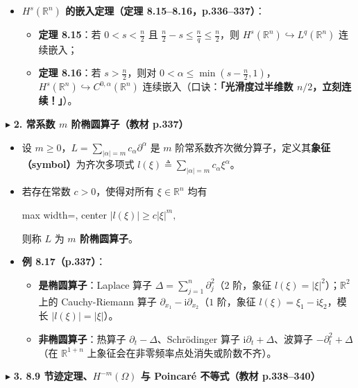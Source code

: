 \documentclass[11pt,a4paper]{article}
\providecommand{\tightlist}{\setlength{\itemsep}{2pt}\setlength{\parskip}{0pt}}
\newcommand{\SubSubHeading}[1]{%
  \Needspace{6.5\baselineskip}\vspace{5.5pt}\noindent
  \textcolor{AccentMain}{\scriptsize$\blacktriangleright$}\hspace{4pt}%
  {\small\bfseries\color{AccentMain}#1}\par\nopagebreak[4]\vspace{2.5pt}%
}
\newcommand{\FitDisplayMath}[1]{%
  \par\vspace{4.5pt}\noindent
  \begin{adjustbox}{max width=\linewidth, center}
    $\displaystyle #1$
  \end{adjustbox}
  \par\vspace{4.5pt}%
}
\begin{document}
\begin{itemize}
\item
  \textbf{\(H^s(\mathbb{R}^n)\) 的嵌入定理（定理 8.15--8.16，p.336--337）}：

  \begin{itemize}
  \tightlist
  \item
    \textbf{定理 8.15}：若 \(0 < s < \frac{n}{2}\) 且 \(\frac{n}{2} - s \le \frac{n}{q} \le \frac{n}{2}\)，则 \(H^s(\mathbb{R}^n) \hookrightarrow L^q(\mathbb{R}^n)\) 连续嵌入；
  \item
    \textbf{定理 8.16}：若 \(s > \frac{n}{2}\)，则对 \(0 < \alpha \le \min\!\left(s - \frac{n}{2}, 1\right)\)，\(H^s(\mathbb{R}^n) \hookrightarrow C^{0,\alpha}(\mathbb{R}^n)\) 连续嵌入（口诀：\textbf{「光滑度过半维数 \(n/2\)，立刻连续！」}）。
  \end{itemize}
\end{itemize}

\SubSubHeading{2. 常系数 \(m\) 阶椭圆算子（教材 p.337）}

\begin{itemize}
\tightlist
\item
  设 \(m \ge 0\)，\(L = \sum_{|\alpha|=m} c_\alpha \partial^\alpha\) 是 \(m\) 阶常系数齐次微分算子，定义其\textbf{象征（symbol）}为齐次多项式 \(l(\xi) \triangleq \sum_{|\alpha|=m} c_\alpha \xi^\alpha\)。
\item
  若存在常数 \(c > 0\)，使得对所有 \(\xi \in \mathbb{R}^n\) 均有 
\FitDisplayMath{|l(\xi)| \ge c|\xi|^m,}
 则称 \(L\) 为 \textbf{\(m\) 阶椭圆算子}。
\item
  \textbf{例 8.17（p.337）}：

  \begin{itemize}
  \tightlist
  \item
    \textbf{是椭圆算子}：Laplace 算子 \(\Delta = \sum_{j=1}^n \partial_j^2\)（\(2\) 阶，象征 \(l(\xi)=|\xi|^2\)）；\(\mathbb{R}^2\) 上的 Cauchy-Riemann 算子 \(\partial_{x_1} - \mathrm{i}\partial_{x_2}\)（\(1\) 阶，象征 \(l(\xi)=\xi_1-\mathrm{i}\xi_2\)，模长 \(|l(\xi)|=|\xi|\)）。
  \item
    \textbf{非椭圆算子}：热算子 \(\partial_t - \Delta\)、Schrödinger 算子 \(\mathrm{i}\partial_t + \Delta\)、波算子 \(-\partial_t^2 + \Delta\)（在 \(\mathbb{R}^{1+n}\) 上象征会在非零频率点处消失或阶数不齐）。
  \end{itemize}
\end{itemize}

\SubSubHeading{3. 8.9 节迹定理、\(H^{-m}(\Omega)\) 与 Poincaré 不等式（教材 p.338--340）}
\end{document}
